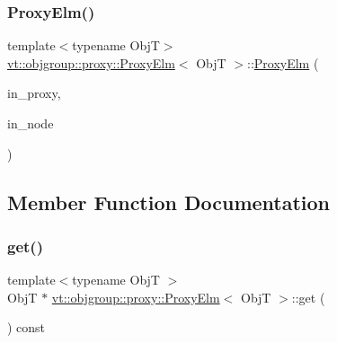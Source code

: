 \mbox{\label{structvt_1_1objgroup_1_1proxy_1_1_proxy_elm_a59a010b3f1428a77cb12a9806028f399}} 
\subsubsection{\texorpdfstring{Proxy\+Elm()}{ProxyElm()}\hspace{0.1cm}{\footnotesize\ttfamily [4/4]}}
{\footnotesize\ttfamily template$<$typename ObjT$>$ \\
\hyperlink{structvt_1_1objgroup_1_1proxy_1_1_proxy_elm}{vt\+::objgroup\+::proxy\+::\+Proxy\+Elm}$<$ ObjT $>$\+::\hyperlink{structvt_1_1objgroup_1_1proxy_1_1_proxy_elm}{Proxy\+Elm} (\begin{DoxyParamCaption}\item[{\hyperlink{namespacevt_ad7cae989df485fccca57f0792a880a8e}{Obj\+Group\+Proxy\+Type}}]{in\+\_\+proxy,  }\item[{\hyperlink{namespacevt_a866da9d0efc19c0a1ce79e9e492f47e2}{Node\+Type}}]{in\+\_\+node }\end{DoxyParamCaption})\hspace{0.3cm}{\ttfamily [inline]}}



\subsection{Member Function Documentation}
\mbox{\label{structvt_1_1objgroup_1_1proxy_1_1_proxy_elm_a4acec5b08c91f8d23a19cc6a61b19c48}} 
\subsubsection{\texorpdfstring{get()}{get()}}
{\footnotesize\ttfamily template$<$typename ObjT $>$ \\
ObjT $\ast$ \hyperlink{structvt_1_1objgroup_1_1proxy_1_1_proxy_elm}{vt\+::objgroup\+::proxy\+::\+Proxy\+Elm}$<$ ObjT $>$\+::get (\begin{DoxyParamCaption}{ }\end{DoxyParamCaption}) const}

